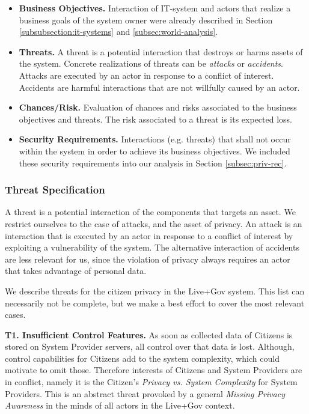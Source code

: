 \documentclass[runningheads,a4paper]{llncs}
\begin{document}
\begin{itemize}

	\item \textbf{Business Objectives.}
	Interaction of IT-system and actors that realize a business goals of the system owner were already described in Section \ref{subsubsection:it-systems} and \ref{subsec:world-analysis}.

	\item \textbf{Threats.}
	A threat is a potential interaction that destroys or harms assets of the system.
	Concrete realizations of threats can be \emph{attacks} or \emph{accidents}.
	Attacks are executed by an actor in response to a conflict of interest.
	Accidents are harmful interactions that are not willfully caused by an actor.
	
	\item \textbf{Chances/Risk.}
	Evaluation of chances and risks associated to the business objectives and threats. The risk associated to a threat is its expected loss.

	\item \textbf{Security Requirements.}
	Interactions (e.g. threats) that shall not occur within the system in order to achieve its business objectives.  We included these security requirements into our analysis in Section \ref{subsec:priv-rec}.
		
\end{itemize}


\subsubsection{Threat Specification}

A threat is a potential interaction of the components that targets an asset.
We restrict ourselves to the case of attacks, and the asset of privacy.
An attack is an interaction that is executed by an actor in response to a conflict of interest by exploiting a vulnerability of the system.
The alternative interaction of accidents are less relevant for us, since the violation of privacy always requires an actor that takes advantage of personal data.

We describe threats for the citizen privacy in the Live+Gov system.
This list can necessarily not be complete, but we make a best effort to cover the most relevant cases.


\textbf{T1. Insufficient Control Features.}
As soon as collected data of Citizens is stored on System Provider servers, all control over that data is lost. Although, control capabilities for Citizens add to the system complexity, which could motivate to omit those. Therefore interests of Citizens and System Providers are in conflict, namely it is the Citizen's \textit{Privacy vs. System Complexity} for System Providers. This is an abstract threat provoked by a general \textit{Missing Privacy Awareness} in the minds of all actors in the Live+Gov context.
\end{document}
